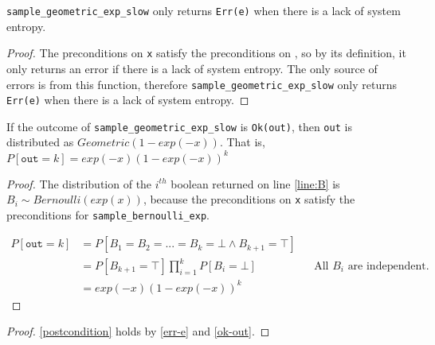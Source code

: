 \documentclass{article}
\begin{document}
\begin{lemma}\label{err-e}
    \texttt{sample\_geometric\_exp\_slow} only returns \texttt{Err(e)} when there is a lack of system entropy.
\end{lemma}

\begin{proof}
    The preconditions on \texttt{x} satisfy the preconditions on ,
    so by its definition, it only returns an error if there is a lack of system entropy.
    The only source of errors is from this function,
    therefore \texttt{sample\_geometric\_exp\_slow} only returns \texttt{Err(e)} when there is a lack of system entropy.
\end{proof}

\begin{theorem} \label{ok-out} \cite{CKS20}
    If the outcome of \texttt{sample\_geometric\_exp\_slow} is \texttt{Ok(out)}, 
    then \texttt{out} is distributed as $Geometric(1 - exp(-x))$. That is, $P[\texttt{out} = k] = exp(-x) (1 - exp(-x))^{k}$ 
\end{theorem}

\begin{proof}
    The distribution of the $i^{th}$ boolean returned on line \ref{line:B} is $B_i \sim Bernoulli(exp(x))$,
    because the preconditions on \texttt{x} satisfy the preconditions for \texttt{sample\_bernoulli\_exp}.
    
    \begin{align*}
        P[\texttt{out} = k] &= P[B_1 = B_2 = ... = B_k = \bot \land B_{k + 1} = \top] \\
        &= P[B_{k + 1} = \top] \prod_{i=1}^{k} P[B_i = \bot] && \text{All $B_i$ are independent.} \\
        &= exp(-x) (1 - exp(-x))^{k}
    \end{align*}
\end{proof}

\begin{proof}
    \ref{postcondition} holds by \ref{err-e} and \ref{ok-out}.
\end{proof}




\end{document}
